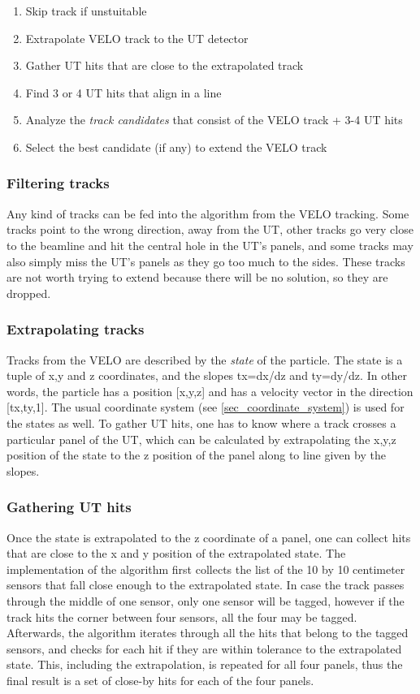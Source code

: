 \documentclass[12pt]{article}
\begin{document}
\begin{enumerate}
	\item Skip track if unstuitable
	\item Extrapolate VELO track to the UT detector
	\item Gather UT hits that are close to the extrapolated track
	\item Find 3 or 4 UT hits that align in a line
	\item Analyze the \textit{track candidates} that consist of the VELO track + 3-4 UT hits
	\item Select the best candidate (if any) to extend the VELO track
\end{enumerate}


\subsubsection{Filtering tracks}

Any kind of tracks can be fed into the algorithm from the VELO tracking. Some tracks point to the wrong direction, away from the UT, other tracks go very close to the beamline and hit the central hole in the UT's panels, and some tracks may also simply miss the UT's panels as they go too much to the sides. These tracks are not worth trying to extend because there will be no solution, so they are dropped.


\subsubsection{Extrapolating tracks}

Tracks from the VELO are described by the \textit{state} of the particle. The state is a tuple of x,y and z coordinates, and the slopes tx=dx/dz and ty=dy/dz. In other words, the particle has a position [x,y,z] and has a velocity vector in the direction [tx,ty,1]. The usual coordinate system (see \ref{sec_coordinate_system}) is used for the states as well. To gather UT hits, one has to know where a track crosses a particular panel of the UT, which can be calculated by extrapolating the x,y,z position of the state to the z position of the panel along to line given by the slopes.


\subsubsection{Gathering UT hits}

Once the state is extrapolated to the z coordinate of a panel, one can collect hits that are close to the x and y position of the extrapolated state. The implementation of the algorithm first collects the list of the 10 by 10 centimeter sensors that fall close enough to the extrapolated state. In case the track passes through the middle of one sensor, only one sensor will be tagged, however if the track hits the corner between four sensors, all the four may be tagged. Afterwards, the algorithm iterates through all the hits that belong to the tagged sensors, and checks for each hit if they are within tolerance to the extrapolated state. This, including the extrapolation, is repeated for all four panels, thus the final result is a set of close-by hits for each of the four panels.
\end{document}
